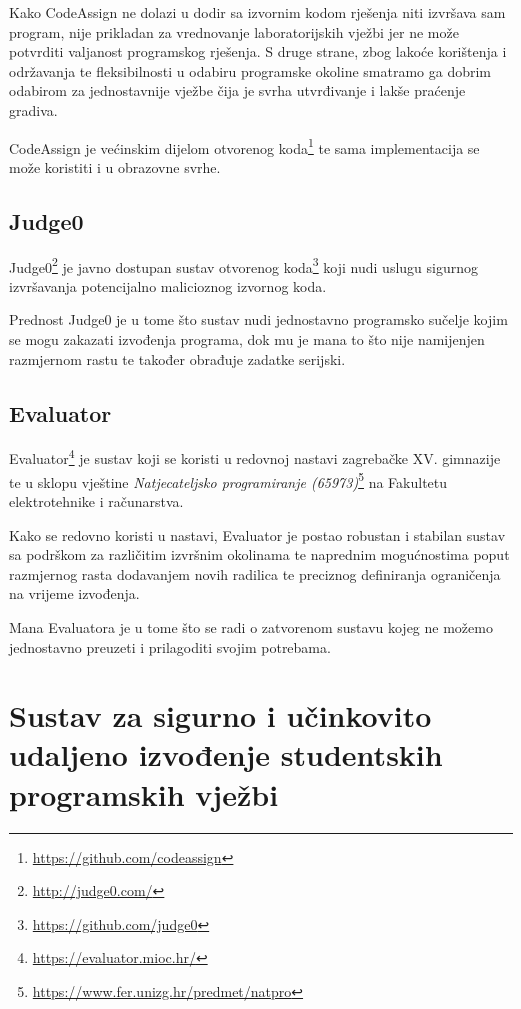 \documentclass[times, utf8, zavrsni]{fer}
\begin{document}
Kako CodeAssign ne dolazi u dodir sa izvornim kodom rješenja niti izvršava sam program, nije prikladan za vrednovanje laboratorijskih vježbi jer ne može potvrditi valjanost programskog rješenja. S druge strane, zbog lakoće korištenja i održavanja te fleksibilnosti u odabiru programske okoline smatramo ga dobrim odabirom za jednostavnije vježbe čija je svrha utvrđivanje i lakše praćenje gradiva.

CodeAssign je većinskim dijelom otvorenog koda{\footnote{\url{https://github.com/codeassign}}} te sama implementacija se može koristiti i u obrazovne svrhe.

\section{Judge0}

Judge0{\footnote{\url{http://judge0.com/}}} je javno dostupan sustav otvorenog koda{\footnote{\url{https://github.com/judge0}}} koji nudi uslugu sigurnog izvršavanja potencijalno malicioznog izvornog koda.

Prednost Judge0 je u tome što sustav nudi jednostavno programsko sučelje kojim se mogu zakazati izvođenja programa, dok mu je mana to što nije namijenjen razmjernom rastu te također obrađuje zadatke serijski. 

\section{Evaluator}

Evaluator{\footnote{\url{https://evaluator.mioc.hr/}}} je sustav koji se koristi u redovnoj nastavi zagrebačke XV. gimnazije te u sklopu vještine {\textit{Natjecateljsko programiranje (65973)}}{\footnote{\url{https://www.fer.unizg.hr/predmet/natpro}}} na Fakultetu elektrotehnike i računarstva.

Kako se redovno koristi u nastavi, Evaluator je postao robustan i stabilan sustav sa podrškom za različitim izvršnim okolinama te naprednim mogućnostima poput razmjernog rasta dodavanjem novih radilica te preciznog definiranja ograničenja na vrijeme izvođenja.

Mana Evaluatora je u tome što se radi o zatvorenom sustavu kojeg ne možemo jednostavno preuzeti i prilagoditi svojim potrebama.

\chapter{Sustav za sigurno i učinkovito udaljeno izvođenje studentskih programskih vježbi}
\end{document}
